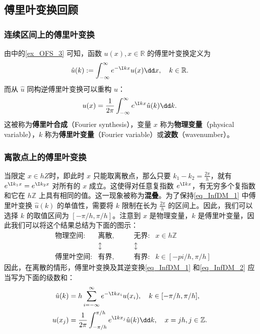 

\subsection{傅里叶变换回顾}
\subsubsection{连续区间上的傅里叶变换}
由中的\autoref{ex_OFS_3} 可知，函数 $u(x),x\in\mathbb R$ 的傅里叶变换定义为
\begin{equation}\label{eq_InfDM_1}
\hat u(k):=\int_{-\infty}^{\infty} e^{-\I kx}u(x)\dd x,\quad k\in\mathbb R.~
\end{equation}
而从 $\hat u$ 同构逆傅里叶变换可以重构 $u$：
\begin{equation}\label{eq_InfDM_2}
u(x)=\frac{1}{2\pi}\int_{-\infty}^{\infty} e^{\I kx}\hat u(k)\dd k.~
\end{equation}
这被称为\textbf{傅里叶合成}（Fourier synthesis），变量 $x$ 称为\textbf{物理变量}（physical variable），$k$ 称为\textbf{傅里叶变量}（Fourier variable）或\textbf{波数}（wavenumber）。

\subsubsection{离散点上的傅里叶变换}
当限定 $x\in hZ$时，即此时 $x$ 只能取离散点，那么只要 $k_1-k_2=\frac{2\pi}{h}$，就有 $e^{\I k_1x}=e^{\I k_2x}$ 对所有的 $x$ 成立。这使得对任意复指数 $e^{\I kx}$，有无穷多个复指数和它在 $h\mathbb Z$ 上具有相同的值。这一现象被称为\textbf{混叠}。为了保持\autoref{eq_InfDM_1} 中傅里叶变换 $\hat u(k)$ 的单值性，需要将 $k$ 限制在长为 $\frac{2\pi}{h}$ 的区间上。因此，我们可以选择 $k$ 的取值区间为 $[-\pi/h,\pi/h]$。注意到 $x$ 是物理变量，$k$ 是傅里叶变量，因此我们可以将这个结果总结为下面的图示：
\begin{equation}
\begin{aligned}
&\text{物理空间:}& \text{离散},&\qquad\text{无界:} &x\in h\mathbb Z\\
&&\updownarrow&\qquad\updownarrow&\\
&\text{傅里叶空间:}& \text{有界},&\qquad\text{有界:} &k\in [-pi/h,\pi/h]
\end{aligned}~
\end{equation}
因此，在离散的情形，傅里叶变换及其逆变换\autoref{eq_InfDM_1} 和\autoref{eq_InfDM_2} 应当写为下面的级数和：
\begin{equation}\label{eq_InfDM_3}
\begin{aligned}
\hat u(k)&=h\sum_{i=-\infty}^{\infty}e^{-\I kx_i}u(x_i),\quad k\in[-\pi/h,\pi/h],\\
u(x_j)&=\frac{1}{2\pi}\int_{-\pi/h}^{\pi/h} e^{\I kx_j}\hat u(k)\dd k,\quad x=jh,j\in \mathbb Z.
\end{aligned}~
\end{equation}



